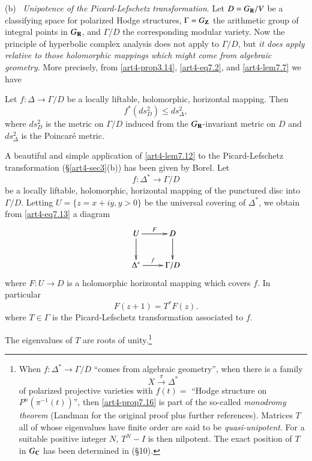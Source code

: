 \noindent
(b)~ \textit{Unipotence of the Picard-Lefschetz transformation}. Let $D= G_{\mathbf{R}} / V$ be a classifying space for polarized Hodge structures, $\Gamma = G_{\mathbf{Z}}$ the arithmetic group of integral points in $G_{\mathbf{R}}$, and $\Gamma / D$ the corresponding modular variety. Now the principle of hyperbolic complex analysis does not apply to $\Gamma/D$, but \textit{it does apply relative to those holomorphic mappings which might come from algebraic geometry.} More precisely, from \eqref{art4-prop3.14}, \eqref{art4-eq7.2}, and \eqref{art4-lem7.7} we have

\begin{lemma}\label{art4-lem7.12}
Let $f : \Delta \to \Gamma / D$ be a locally liftable, holomorphic, horizontal mapping. Then 
$$
f^\ast (ds^2_D) \leqslant ds^2_\Delta,
$$\pageoriginale
where $ds^2_D$ is the metric on $\Gamma/D$ induced from the $G_{\mathbf{R}}$-invariant metric on $D$ and $ds^2_\Delta$ is the Poincar\'e metric. 
\end{lemma}

A beautiful and simple application of \eqref{art4-lem7.12} to the Picard-Lefschetz transformation (\S \ref{art4-sec3}(b)) has been given by Borel. Let
\begin{equation}
f : \Delta^\ast \to \Gamma / D\label{art4-eq7.13}
\end{equation}
be a locally liftable, holomorphic, horizontal mapping of the punctured disc into $\Gamma/ D$. Letting $U = \{z = x + iy, y > 0\}$ be the universal covering of $\Delta^\ast$, we obtain from \eqref{art4-eq7.13} a diagram 
\begin{equation}
\xymatrix{
U\ar[r]^-F \ar[d] & D \ar[d]\\
\Delta^\ast \ar[r]^-f & \Gamma / D}
\label{art4-eq7.14}
\end{equation}
where $F : U \to D$ is a holomorphic horizontal mapping which covers $f$. In particular
\begin{equation}
F(z+1) = T^\ast F (z). \label{art4-eq7.15}
\end{equation}
where $T \in \Gamma$ is the Picard-Lefschetz transformation associated to $f$.

\begin{proposition}[Borel]\label{art4-prop7.16}
The eigenvalues of $T$ are roots of unity.\footnote[30]{When $f: \Delta^\ast \to \Gamma / D$ ``comes from algebraic geometry'', \ie when there is a family
$$
X \xrightarrow{\pi} \Delta^\ast 
$$
of polarized projective varieties with $f(t) = $ ``Hodge structure on $P^n (\pi^{-1} (t))$'', then \eqref{art4-prop7.16} is part of the so-called \textit{monodromy theorem} (\cf Landman \cite{art4-key35} for the original proof plus further references). Matrices $T$ all of whose eigenvalues have finite order are said to be \textit{quasi-unipotent}. For a suitable positive integer $N$, $T^N -I$ is then nilpotent. The exact position of $T$ in $G_{\mathbf{C}}$ has been determined  in \cite{art4-key41} (\cf \S 10).}
\end{proposition}

